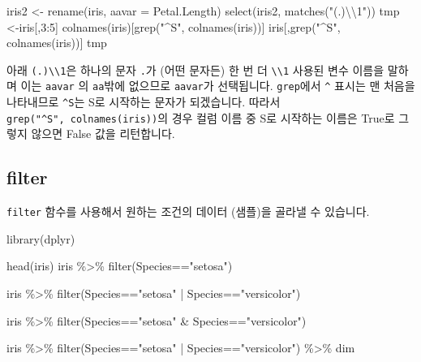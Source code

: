 \documentclass[
]{book}
\newenvironment{Shaded}{\begin{snugshade}}{\end{snugshade}}
\newcommand{\AttributeTok}[1]{\textcolor[rgb]{0.77,0.63,0.00}{#1}}
\newcommand{\DecValTok}[1]{\textcolor[rgb]{0.00,0.00,0.81}{#1}}
\newcommand{\FunctionTok}[1]{\textcolor[rgb]{0.00,0.00,0.00}{#1}}
\newcommand{\NormalTok}[1]{#1}
\newcommand{\OtherTok}[1]{\textcolor[rgb]{0.56,0.35,0.01}{#1}}
\newcommand{\SpecialCharTok}[1]{\textcolor[rgb]{0.00,0.00,0.00}{#1}}
\newcommand{\StringTok}[1]{\textcolor[rgb]{0.31,0.60,0.02}{#1}}
\begin{document}
\begin{Shaded}
\begin{Highlighting}[]
\NormalTok{iris2 }\OtherTok{\textless{}{-}} \FunctionTok{rename}\NormalTok{(iris, }\AttributeTok{aavar =}\NormalTok{ Petal.Length)}
\FunctionTok{select}\NormalTok{(iris2, }\FunctionTok{matches}\NormalTok{(}\StringTok{"(.)}\SpecialCharTok{\textbackslash{}\textbackslash{}}\StringTok{1"}\NormalTok{))}
\NormalTok{tmp }\OtherTok{\textless{}{-}}\NormalTok{iris[,}\DecValTok{3}\SpecialCharTok{:}\DecValTok{5}\NormalTok{]}
\FunctionTok{colnames}\NormalTok{(iris)[}\FunctionTok{grep}\NormalTok{(}\StringTok{"\^{}S"}\NormalTok{, }\FunctionTok{colnames}\NormalTok{(iris))]}
\NormalTok{iris[,}\FunctionTok{grep}\NormalTok{(}\StringTok{"\^{}S"}\NormalTok{, }\FunctionTok{colnames}\NormalTok{(iris))]}
\NormalTok{tmp}
\end{Highlighting}
\end{Shaded}

아래 \texttt{(.)\textbackslash{}\textbackslash{}1}은 하나의 문자 \texttt{.}가 (어떤 문자든) 한 번 더 \texttt{\textbackslash{}\textbackslash{}1} 사용된 변수 이름을 말하며 이는 \texttt{aavar} 의 \texttt{aa}밖에 없으므로 \texttt{aavar}가 선택됩니다. \texttt{grep}에서 \texttt{\^{}} 표시는 맨 처음을 나타내므로 \texttt{\^{}S}는 S로 시작하는 문자가 되겠습니다. 따라서 \texttt{grep("\^{}S",\ colnames(iris))}의 경우 컬럼 이름 중 S로 시작하는 이름은 True로 그렇지 않으면 False 값을 리턴합니다.

\hypertarget{filter}{%
\subsection{filter}\label{filter}}

\texttt{filter} 함수를 사용해서 원하는 조건의 데이터 (샘플)을 골라낼 수 있습니다.

\begin{Shaded}
\begin{Highlighting}[]
\FunctionTok{library}\NormalTok{(dplyr)}

\FunctionTok{head}\NormalTok{(iris)}
\NormalTok{iris }\SpecialCharTok{\%\textgreater{}\%} 
  \FunctionTok{filter}\NormalTok{(Species}\SpecialCharTok{==}\StringTok{"setosa"}\NormalTok{)}

\NormalTok{iris }\SpecialCharTok{\%\textgreater{}\%} 
  \FunctionTok{filter}\NormalTok{(Species}\SpecialCharTok{==}\StringTok{"setosa"} \SpecialCharTok{|}\NormalTok{ Species}\SpecialCharTok{==}\StringTok{"versicolor"}\NormalTok{)}

\NormalTok{iris }\SpecialCharTok{\%\textgreater{}\%} 
  \FunctionTok{filter}\NormalTok{(Species}\SpecialCharTok{==}\StringTok{"setosa"} \SpecialCharTok{\&}\NormalTok{ Species}\SpecialCharTok{==}\StringTok{"versicolor"}\NormalTok{)}

\NormalTok{iris }\SpecialCharTok{\%\textgreater{}\%} 
  \FunctionTok{filter}\NormalTok{(Species}\SpecialCharTok{==}\StringTok{"setosa"} \SpecialCharTok{|}\NormalTok{ Species}\SpecialCharTok{==}\StringTok{"versicolor"}\NormalTok{) }\SpecialCharTok{\%\textgreater{}\%} 
\NormalTok{  dim}
\end{Highlighting}
\end{Shaded}
\end{document}
